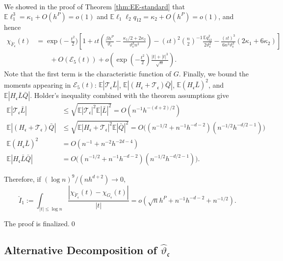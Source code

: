 \documentclass[11pt]{article}
\numberwithin{equation}{section}
\theoremstyle{definition}
\newcommand{\E}{\mathbb{E}}
\newcommand{\Scale}{\vartheta}
\begin{document}
We showed in the proof of Theorem \ref{thm:EE-standard} that $\E\ell_1^3 = \kappa_1 + O(h^P)=o(1)$ and $\E\ell_1\ell_2q_{12} = \kappa_2 + O(h^P)=o(1)$, and hence
\begin{align*}
     \chi_{\breve{F}_\mathfrak{c}}(t)
     &= \exp\Big(-\tfrac{t^2}{2}\Big)\left[1 + \iota t\left(\tfrac{\beta h^P}{\vartheta_\mathfrak{c}} - \tfrac{\kappa_1/2 + 2 \kappa_2}{\vartheta_\mathfrak{c}^3n^2}\right) - (\iota t)^2\binom{n}{2}^{-1}\frac{\E q_{12}^2}{2\vartheta_\mathfrak{c}^2} -\tfrac{(\iota t)^3}{6n^2\vartheta_\mathfrak{c}^3}(2\kappa_1 + 6\kappa_2)\right]\\
     &\qquad+ O(\mathcal{E}_5(t)) +o\left(\exp\left(-\tfrac{t^2}{2}\right)\tfrac{|t|+|t|^3}{\sqrt{n}}\right).
\end{align*}
Note that the first term is the characteristic function of $G$. Finally, we bound the moments appearing in $\mathcal{E}_5(t)$: $\E|\mathcal{T}_\mathfrak{c}\bar{L}|$, $\E|(H_\mathfrak{c}+\mathcal{T}_\mathfrak{c})\bar{Q}|$, $\E(H_\mathfrak{c}\bar{L})^2$, and $\E|H_\mathfrak{c}\bar{L}\bar{Q}|$. Holder's inequality combined with the theorem assumptions give
\begin{align*}
    \E|\mathcal{T}_\mathfrak{c}\bar{L}| &\leq \sqrt{\E|\mathcal{T}_\mathfrak{c}|^2\E|\bar{L}|^2} = O(n^{-1}h^{-(d+2)/2})\\
    \E|(H_\mathfrak{c}+\mathcal{T}_\mathfrak{c})\bar{Q}| &\leq \sqrt{\E|H_\mathfrak{c}+\mathcal{T}_\mathfrak{c}|^2\E|\bar{Q}|^2}= O\big((n^{-1/2} + n^{-1}h^{-d-2})(n^{-1/2}h^{-d/2-1})\big)\\
    \E(H_\mathfrak{c}\bar{L})^2 & = O(n^{-1} + n^{-2}h^{-2d-4})\\
    \E|H_\mathfrak{c}\bar{L}\bar{Q}| &= O\big((n^{-1/2} + n^{-1}h^{-d-2})(n^{-1/2}h^{-d/2 - 1})\big).
\end{align*}

Therefore, if $(\log n)^9/(nh^{d+2})\to 0$,
\[\breve{I}_1 := \int_{|t|\leq \log n} \frac{|\chi_{\breve{F}_\mathfrak{c}}(t) - \chi_{G_\mathfrak{c}}(t)|}{|t|} = o(\sqrt{n}h^P + {n^{-1}h^{-d-2}} + n^{-1/2}).\]

The proof is finalized.\qed

\subsection{Alternative Decomposition of $\widehat{\Scale}_\mathfrak{c}$}
\end{document}

